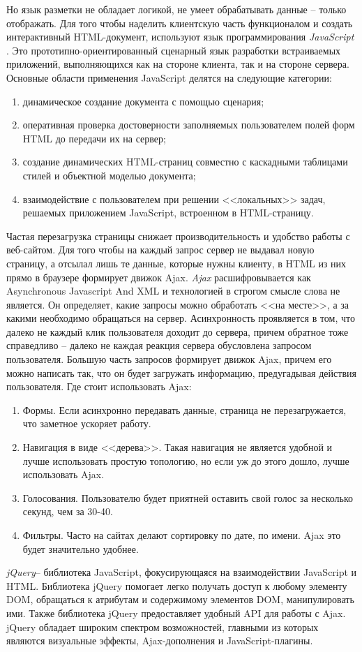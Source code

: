 Но язык разметки не обладает логикой, не умеет обрабатывать данные -- только отображать. Для того чтобы наделить клиентскую часть функционалом и создать интерактивный HTML-документ, используют язык программирования {\itshape JavaScript }. Это прототипно-ориентированный сценарный язык разработки встраиваемых приложений, выполняющихся как на стороне клиента, так и на стороне сервера\cite{php}.
Основные области применения JavaScript делятся на следующие категории:
\begin{enumerate}
\item динамическое создание документа с помощью сценария;
\item оперативная проверка достоверности заполняемых пользователем полей форм HTML до передачи их на сервер;
\item создание динамических HTML-страниц совместно с каскадными таблицами стилей и объектной моделью документа;
\item взаимодействие с пользователем при решении <<локальных>> задач, решаемых приложением JavaScript, встроенном в HTML-страницу.
\end{enumerate}

Частая перезагрузка страницы снижает производительность и удобство работы с веб-сайтом. Для того чтобы на каждый запрос сервер не выдавал новую страницу, а отсылал лишь те данные, которые нужны клиенту, в HTML из них прямо в браузере формирует движок Ajax.
{\itshape Ajax } расшифровывается как Asynchronous Javascript And XML и технологией в строгом смысле слова не является. Он определяет, какие запросы можно обработать <<на месте>>, а за какими необходимо обращаться на сервер. Асинхронность проявляется в том, что далеко не каждый клик пользователя доходит до сервера, причем обратное тоже справедливо -- далеко не каждая реакция сервера обусловлена запросом пользователя. Большую часть запросов формирует движок Ajax, причем его можно написать так, что он будет загружать информацию, предугадывая действия пользователя\cite{php}.
Где стоит использовать Ajax:
\begin{enumerate}
\item Формы. Если асинхронно передавать данные, страница не перезагружается, что заметное ускоряет работу.
\item Навигация в виде <<дерева>>. Такая навигация не является удобной и лучше использовать простую топологию, но если уж до этого дошло, лучше использовать Ajax.
\item Голосования. Пользователю будет приятней оставить свой голос за несколько секунд, чем за 30-40.
\item Фильтры. Часто на сайтах делают сортировку по дате, по имени. Ajax это будет значительно удобнее.
\end{enumerate}

 
{\itshape jQuery}-- библиотека JavaScript, фокусирующаяся на взаимодействии JavaScript и HTML. Библиотека jQuery помогает легко получать доступ к любому элементу DOM, обращаться к атрибутам и содержимому элементов DOM, манипулировать ими. Также библиотека jQuery предоставляет удобный API для работы с Ajax. jQuery обладает широким спектром возможностей, главными из которых являются визуальные эффекты, Ajax-дополнения и JavaScript-плагины\cite{php}.


\clearpage
